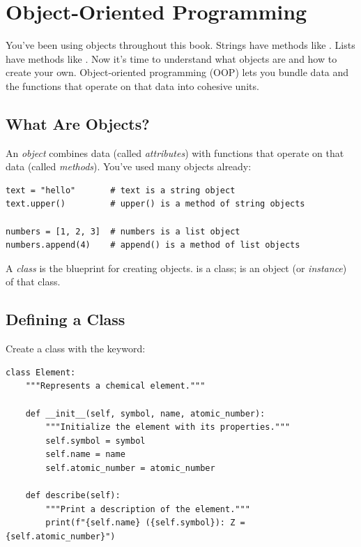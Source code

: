 
\chapter{Object-Oriented Programming}
\label{chap:oop}

You've been using objects throughout this book. Strings have methods like . Lists have methods like . Now it's time to understand what objects are and how to create your own. Object-oriented programming (OOP) lets you bundle data and the functions that operate on that data into cohesive units.

\section{What Are Objects?}
\label{sec:what-are-objects}

An \emph{object} combines data (called \emph{attributes}) with functions that operate on that data (called \emph{methods}). You've used many objects already:

\begin{lstlisting}
text = "hello"       # text is a string object
text.upper()         # upper() is a method of string objects

numbers = [1, 2, 3]  # numbers is a list object
numbers.append(4)    # append() is a method of list objects
\end{lstlisting}

A \emph{class} is the blueprint for creating objects.  is a class;  is an object (or \emph{instance}) of that class.

\section{Defining a Class}
\label{sec:defining-class}

Create a class with the  keyword:

\begin{lstlisting}
class Element:
    """Represents a chemical element."""

    def __init__(self, symbol, name, atomic_number):
        """Initialize the element with its properties."""
        self.symbol = symbol
        self.name = name
        self.atomic_number = atomic_number

    def describe(self):
        """Print a description of the element."""
        print(f"{self.name} ({self.symbol}): Z = {self.atomic_number}")
\end{lstlisting}

